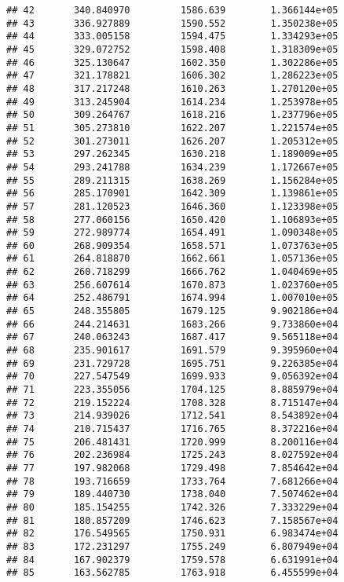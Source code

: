 \documentclass[]{article}
\begin{document}
\begin{verbatim}
## 42       340.840970         1586.639        1.366144e+05
## 43       336.927889         1590.552        1.350238e+05
## 44       333.005158         1594.475        1.334293e+05
## 45       329.072752         1598.408        1.318309e+05
## 46       325.130647         1602.350        1.302286e+05
## 47       321.178821         1606.302        1.286223e+05
## 48       317.217248         1610.263        1.270120e+05
## 49       313.245904         1614.234        1.253978e+05
## 50       309.264767         1618.216        1.237796e+05
## 51       305.273810         1622.207        1.221574e+05
## 52       301.273011         1626.207        1.205312e+05
## 53       297.262345         1630.218        1.189009e+05
## 54       293.241788         1634.239        1.172667e+05
## 55       289.211315         1638.269        1.156284e+05
## 56       285.170901         1642.309        1.139861e+05
## 57       281.120523         1646.360        1.123398e+05
## 58       277.060156         1650.420        1.106893e+05
## 59       272.989774         1654.491        1.090348e+05
## 60       268.909354         1658.571        1.073763e+05
## 61       264.818870         1662.661        1.057136e+05
## 62       260.718299         1666.762        1.040469e+05
## 63       256.607614         1670.873        1.023760e+05
## 64       252.486791         1674.994        1.007010e+05
## 65       248.355805         1679.125        9.902186e+04
## 66       244.214631         1683.266        9.733860e+04
## 67       240.063243         1687.417        9.565118e+04
## 68       235.901617         1691.579        9.395960e+04
## 69       231.729728         1695.751        9.226385e+04
## 70       227.547549         1699.933        9.056392e+04
## 71       223.355056         1704.125        8.885979e+04
## 72       219.152224         1708.328        8.715147e+04
## 73       214.939026         1712.541        8.543892e+04
## 74       210.715437         1716.765        8.372216e+04
## 75       206.481431         1720.999        8.200116e+04
## 76       202.236984         1725.243        8.027592e+04
## 77       197.982068         1729.498        7.854642e+04
## 78       193.716659         1733.764        7.681266e+04
## 79       189.440730         1738.040        7.507462e+04
## 80       185.154255         1742.326        7.333229e+04
## 81       180.857209         1746.623        7.158567e+04
## 82       176.549565         1750.931        6.983474e+04
## 83       172.231297         1755.249        6.807949e+04
## 84       167.902379         1759.578        6.631991e+04
## 85       163.562785         1763.918        6.455599e+04

\end{verbatim}
\end{document}
